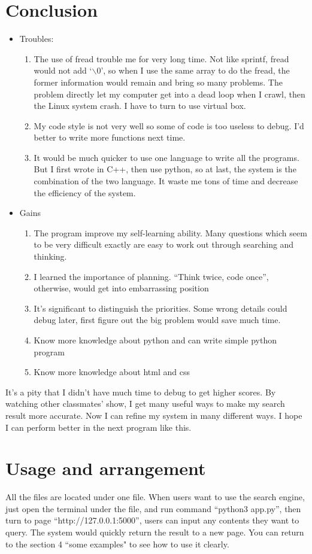 \documentclass{article}
\begin{document}
\section{Conclusion}
\begin{itemize}
\item Troubles:
\begin{enumerate}
\item The use of fread trouble me for very long time. Not like sprintf, fread would not add `$\backslash$0', so when I use the same array to do the fread, the former information would remain and bring so many problems. The problem directly let my computer get into a dead loop when I crawl, then the Linux system crash. I have to turn to use virtual box.
\item My code style is not very well so some of code is too useless to debug. I'd better to write more functions next time.
\item It would be much quicker to use one language to write all the programs. But I first wrote in C++, then use python, so at last, the system is the combination of the two language. It waste me tons of time and decrease the efficiency of the system.
\end{enumerate}
\item Gains
\begin{enumerate}
\item The program improve my self-learning ability. Many questions which seem to be very difficult exactly are easy to work out through searching and thinking.
\item I learned the importance of planning. “Think twice, code once”, otherwise, would get into embarrassing position
\item It’s significant to distinguish the priorities. Some wrong details could debug later, first figure out the big problem would save much time.
\item Know more knowledge about python and can write simple python program
\item Know more knowledge about html and css
\end{enumerate}
\end{itemize}
It’s a pity that I didn’t have much time to debug to get higher scores. By watching other classmates’ show, I get many useful ways to make my search result more accurate. Now I can refine my system in many different ways. I hope I can perform better in the next program like this.
\section{Usage and arrangement}
All the files are located under one file. When users want to use the search engine, just open the terminal under the file, and run command “python3 app.py”, then turn to page “http://127.0.0.1:5000”, users can input any contents they want to query. The system would quickly return the result to a new page. You can return to the section 4 ``some examples" to see how to use it clearly.
\end{document}
